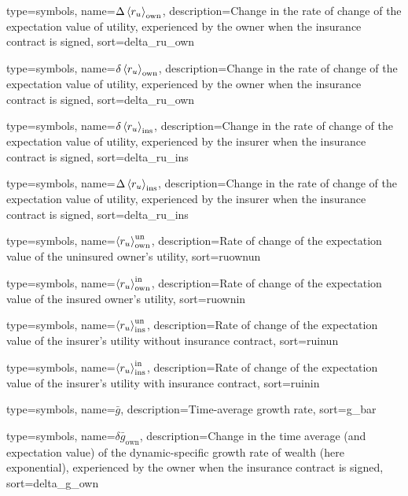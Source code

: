 {
 type={symbols}, 
 name={\ensuremath{\Delta \ave{r_u}_{\text{own}}}},
 description={Change in the rate of change of the expectation value of utility, experienced by the owner when the insurance contract is signed},
 sort=delta_ru_own
}

{
 type={symbols}, 
 name={\ensuremath{\delta \ave{r_u}_{\text{own}}}},
 description={Change in the rate of change of the expectation value of utility, experienced by the owner when the insurance contract is signed},
 sort=delta_ru_own
}

{
 type={symbols}, 
 name={\ensuremath{\delta \ave{r_u}_{\text{ins}}}},
 description={Change in the rate of change of the expectation value of utility, experienced by the insurer when the insurance contract is signed},
 sort=delta_ru_ins
}

{
 type={symbols}, 
 name={\ensuremath{\Delta \ave{r_u}_{\text{ins}}}},
 description={Change in the rate of change of the expectation value of utility, experienced by the insurer when the insurance contract is signed},
 sort=delta_ru_ins
}

{
  type={symbols}, 
  name={\ensuremath{\ave{r_u}_{\text{own}}^{\text{un}}}},
  description={Rate of change of the expectation value of the uninsured owner's utility},
  sort=ruownun
}

{
  type={symbols}, 
  name={\ensuremath{\ave{r_u}_{\text{own}}^{\text{in}}}},
  description={Rate of change of the expectation value of the insured owner's utility},
  sort=ruownin
}


{
  type={symbols}, 
  name={\ensuremath{\ave{r_u}_{\text{ins}}^{\text{un}}}},
  description={Rate of change of the expectation value of the insurer's utility without insurance contract},
  sort=ruinun
}

{
  type={symbols}, 
  name={\ensuremath{\ave{r_u}_{\text{ins}}^{\text{in}}}},
  description={Rate of change of the expectation value of the insurer's utility with insurance contract},
  sort=ruinin
}



{
  type={symbols}, 
  name={\ensuremath{\bar{g}}},
  description={Time-average growth rate},
  sort=g_bar
}


{
 type={symbols}, 
 name={\ensuremath{\delta \bar{g}_{\text{own}}}},
 description={Change in the time average (and expectation value) of the dynamic-specific growth rate of wealth (here exponential), experienced by the owner when the insurance contract is signed},
 sort=delta_g_own
}


